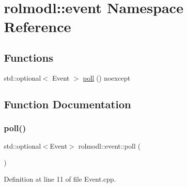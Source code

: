\hypertarget{namespacerolmodl_1_1event}{}\section{rolmodl\+::event Namespace Reference}
\label{namespacerolmodl_1_1event}
\subsection*{Functions}
\begin{DoxyCompactItemize}
\item 
std\+::optional$<$ Event $>$ \mbox{\hyperlink{namespacerolmodl_1_1event_a56507d78acb31b142da040fe828f912c}{poll}} () noexcept
\end{DoxyCompactItemize}


\subsection{Function Documentation}
\mbox{\label{namespacerolmodl_1_1event_a56507d78acb31b142da040fe828f912c}} 
\subsubsection{\texorpdfstring{poll()}{poll()}}
{\footnotesize\ttfamily std\+::optional$<$Event$>$ rolmodl\+::event\+::poll (\begin{DoxyParamCaption}{ }\end{DoxyParamCaption})\hspace{0.3cm}{\ttfamily [noexcept]}}



Definition at line 11 of file Event.\+cpp.

